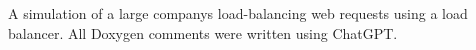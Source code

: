 A simulation of a large company\textquotesingle{}s load-\/balancing web requests using a load balancer. All Doxygen comments were written using Chat\+G\+PT. 